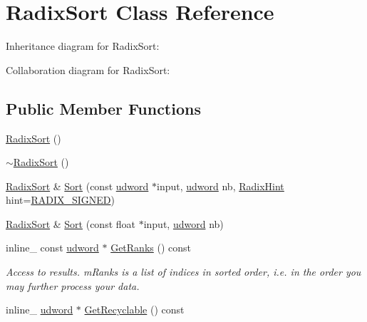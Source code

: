 \hypertarget{class_radix_sort}{\section{Radix\+Sort Class Reference}
\label{class_radix_sort}
}


Inheritance diagram for Radix\+Sort\+:


Collaboration diagram for Radix\+Sort\+:
\subsection*{Public Member Functions}
\begin{DoxyCompactItemize}
\item 
\hyperlink{class_radix_sort_a92fec8f9bb15493736ca119f92fbaea9}{Radix\+Sort} ()
\item 
\hyperlink{class_radix_sort_ac477ade290104f955836b4750c521cb6}{$\sim$\+Radix\+Sort} ()
\item 
\hyperlink{class_radix_sort}{Radix\+Sort} \& \hyperlink{class_radix_sort_a815a222b3f7d555bf741bff989a32d27}{Sort} (const \hyperlink{_ice_types_8h_a44c6f1920ba5551225fb534f9d1a1733}{udword} $\ast$input, \hyperlink{_ice_types_8h_a44c6f1920ba5551225fb534f9d1a1733}{udword} nb, \hyperlink{_ice_revisited_radix_8h_acf223d4d688c445c2088d9b2d9aee8d0}{Radix\+Hint} hint=\hyperlink{_ice_revisited_radix_8h_acf223d4d688c445c2088d9b2d9aee8d0a91fa3afcca04aadade3caad8b46d511b}{R\+A\+D\+I\+X\+\_\+\+S\+I\+G\+N\+E\+D})
\item 
\hyperlink{class_radix_sort}{Radix\+Sort} \& \hyperlink{class_radix_sort_a07ce3c442cb8443012cab92f94351246}{Sort} (const float $\ast$input, \hyperlink{_ice_types_8h_a44c6f1920ba5551225fb534f9d1a1733}{udword} nb)
\item 
\hypertarget{class_radix_sort_a705769648fdad72220225ca543b18f2d}{inline\+\_\+ const \hyperlink{_ice_types_8h_a44c6f1920ba5551225fb534f9d1a1733}{udword} $\ast$ \hyperlink{class_radix_sort_a705769648fdad72220225ca543b18f2d}{Get\+Ranks} () const }\label{class_radix_sort_a705769648fdad72220225ca543b18f2d}

\begin{DoxyCompactList}\small\item\em Access to results. m\+Ranks is a list of indices in sorted order, i.\+e. in the order you may further process your data. \end{DoxyCompactList}\item 
\hypertarget{class_radix_sort_a953a9429075bb3350b1d372972ca0d30}{inline\+\_\+ \hyperlink{_ice_types_8h_a44c6f1920ba5551225fb534f9d1a1733}{udword} $\ast$ \hyperlink{class_radix_sort_a953a9429075bb3350b1d372972ca0d30}{Get\+Recyclable} () const }\label{class_radix_sort_a953a9429075bb3350b1d372972ca0d30}


\end{DoxyCompactItemize}
